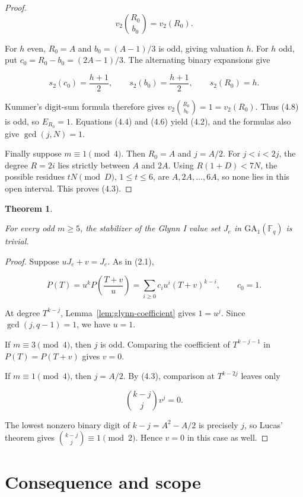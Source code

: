\documentclass[11pt]{article}
\newtheorem{theorem}{Theorem}[section]
\begin{document}
\begin{proof}
\[
v_2\!\binom{R_0}{b_0}=v_2(R_0).
\tag{4.9}
\]

For \(h\) even, \(R_0=A\) and \(b_0=(A-1)/3\) is odd, giving valuation \(h\).
For \(h\) odd, put \(c_0=R_0-b_0=(2A-1)/3\). The alternating binary
expansions give

\[
s_2(c_0)=\frac{h+1}{2},\qquad
s_2(b_0)=\frac{h+1}{2},\qquad
s_2(R_0)=h.
\]

Kummer's digit-sum formula therefore gives
\(v_2\binom{R_0}{b_0}=1=v_2(R_0)\). Thus (4.8) is odd, so \(E_{R_0}=1\).
Equations (4.4) and (4.6) yield (4.2), and the formulas also give
\(\gcd(j,N)=1\).

Finally suppose \(m\equiv1\pmod4\). Then \(R_0=A\) and \(j=A/2\). For
\(j<i<2j\), the degree \(R=2i\) lies strictly between \(A\) and \(2A\).
Using \(R(1+D)<7N\), the possible residues \(tN\pmod D\), \(1\le t\le6\),
are \(A,2A,\ldots,6A\), so none lies in this open interval. This proves (4.3).

\end{proof}


\Needspace{0.18\textheight}
\begin{theorem}
\label{thm:glynn}

For every odd \(m\ge5\), the stabilizer of the Glynn I value set \(J_e\) in
\(\mathrm{GA}_1(\mathbb F_q)\) is trivial.

\end{theorem}

\begin{proof}

Suppose \(uJ_e+v=J_e\). As in (2.1),

\[
P(T)=u^kP\!\left(\frac{T+v}{u}\right)
=\sum_{i\ge0}c_i u^i(T+v)^{k-i},\qquad c_0=1.
\tag{4.10}
\]

At degree \(T^{k-j}\), Lemma~\ref{lem:glynn-coefficient} gives \(1=u^j\). Since
\(\gcd(j,q-1)=1\), we have \(u=1\).

If \(m\equiv3\pmod4\), then \(j\) is odd. Comparing the coefficient of
\(T^{k-j-1}\) in \(P(T)=P(T+v)\) gives \(v=0\).

If \(m\equiv1\pmod4\), then \(j=A/2\). By (4.3), comparison at
\(T^{k-2j}\) leaves only

\[
\binom{k-j}{j}v^j=0.
\]

The lowest nonzero binary digit of \(k-j=A^2-A/2\) is precisely \(j\), so
Lucas' theorem gives \(\binom{k-j}{j}\equiv1\pmod2\). Hence \(v=0\) in this
case as well.
\end{proof}


\section{Consequence and scope}
\end{document}
